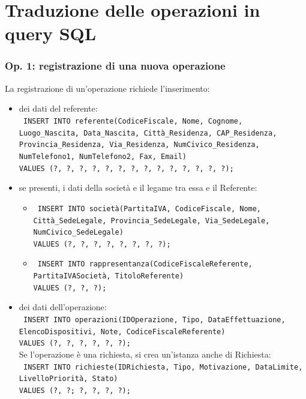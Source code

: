 \documentclass[a4paper,12pt]{report}
\begin{document}
\section{Traduzione delle operazioni in query SQL}

\subsubsection{Op. 1: registrazione di una nuova operazione}

La registrazione di un'operazione richiede l'inserimento:
\begin{itemize}
    \item dei dati del referente: \\
    \texttt{
    INSERT INTO referente(CodiceFiscale, Nome, Cognome, \\
    Luogo\_Nascita, Data\_Nascita, Città\_Residenza, CAP\_Residenza, Provincia\_Residenza, Via\_Residenza,
    NumCivico\_Residenza, NumTelefono1, NumTelefono2, Fax, Email) \\
    VALUES (?, ?, ?, ?, ?, ?, ?, ?, ?, ?, ?, ?, ?, ?);
    }
    \item se presenti, i dati della società e il legame tra essa e il Referente:
    \begin{itemize}
        \item \texttt{
        INSERT INTO società(PartitaIVA, CodiceFiscale, Nome, Città\_SedeLegale, Provincia\_SedeLegale, Via\_SedeLegale, NumCivico\_SedeLegale) \\
        VALUES (?, ?, ?, ?, ?, ?, ?, ?);
        }
        \item \texttt{
        INSERT INTO rappresentanza(CodiceFiscaleReferente, PartitaIVASocietà, TitoloReferente) \\
        VALUES (?, ?, ?);
        }
    \end{itemize}
    \item dei dati dell'operazione: \\
    \texttt{
    INSERT INTO operazioni(IDOperazione, Tipo, DataEffettuazione, ElencoDispositivi, Note,
    CodiceFiscaleReferente) \\
    VALUES (?, ?, ?, ?, ?, ?);
    } \\
    Se l'operazione è una richiesta, si crea un'istanza anche di Richiesta: \\
    \texttt{
    INSERT INTO richieste(IDRichiesta, Tipo, Motivazione, DataLimite, LivelloPriorità, Stato) \\
    VALUES (?, ?; ?, ?, ?, ?);
    }
\end{itemize}
\end{document}
